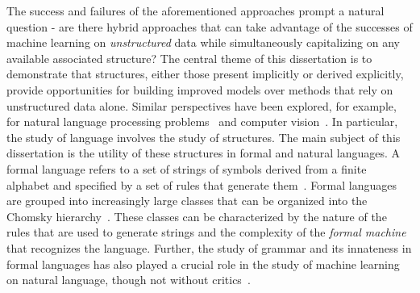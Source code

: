 The success and failures of the aforementioned approaches prompt a natural question - are there hybrid approaches that can take advantage of the successes of machine learning on \textit{unstructured} data while simultaneously capitalizing on any available associated structure?
The central theme of this dissertation is to demonstrate that structures, either those present implicitly or derived explicitly, provide opportunities for building improved models over methods that rely on unstructured data alone.
Similar perspectives have been explored, for example, for natural language processing problems~\citep{wu2021graph} and computer vision~\citep{johnson2018image}.
In particular, the study of language involves the study of structures. 
The main subject of this dissertation is the utility of these structures in formal and natural languages.
A formal language refers to a set of strings of symbols derived from a finite alphabet and specified by a set of rules that generate them~\citep{scott2000programming}.
Formal languages are grouped into increasingly large classes that can be organized into the Chomsky hierarchy~\citep{chomsky1956three}.
These classes can be characterized by the nature of the rules that are used to generate strings and the complexity of the \textit{formal machine} that recognizes the language.
Further, the study of grammar and its innateness in formal languages has also played a crucial role in the study of machine learning on natural language, though not without critics~\citep{pullum2002empirical,linzen2021syntactic}.

